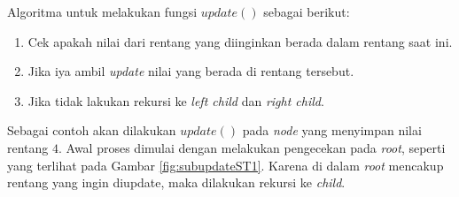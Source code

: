 \quad Algoritma untuk melakukan fungsi \textit{$update()$} sebagai berikut:
\begin{enumerate}
	\item Cek apakah nilai dari rentang yang diinginkan berada dalam rentang saat ini.
	\item Jika iya ambil \textit{update} nilai yang berada di rentang tersebut.
	\item Jika tidak lakukan rekursi ke \textit{left child} dan \textit{right child}.
\end{enumerate} 
\quad Sebagai contoh akan dilakukan \textit{$update()$} pada \textit{node} yang menyimpan nilai rentang $4$. Awal proses dimulai dengan melakukan pengecekan pada \textit{root}, seperti yang terlihat pada Gambar \ref{fig:subupdateST1}. Karena di dalam \textit{root} mencakup rentang yang ingin diupdate, maka dilakukan rekursi ke \textit{child}.
